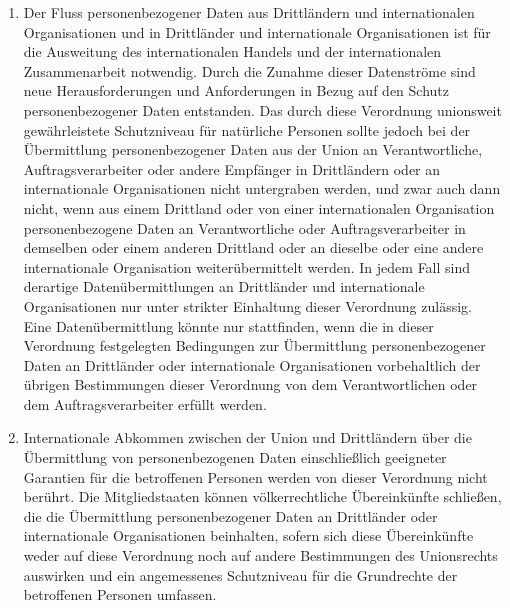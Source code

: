 \begin{enumerate}
   \item Der Fluss personenbezogener Daten aus Drittländern und internationalen Organisationen und in Drittländer und
    internationale Organisationen ist für die Ausweitung des internationalen Handels und der internationalen
    Zusammenarbeit notwendig. Durch die Zunahme dieser Datenströme sind neue Herausforderungen und Anforderungen in
    Bezug auf den Schutz personenbezogener Daten entstanden. Das durch diese Verordnung unionsweit gewährleistete
    Schutzniveau für natürliche Personen sollte jedoch bei der Übermittlung personenbezogener Daten aus der Union an
    Verantwortliche, Auftragsverarbeiter oder andere Empfänger in Drittländern oder an internationale Organisationen
    nicht untergraben werden, und zwar auch dann nicht, wenn aus einem Drittland oder von einer internationalen
    Organisation personenbezogene Daten an Verantwortliche oder Auftragsverarbeiter in demselben oder einem anderen
    Drittland oder an dieselbe oder eine andere internationale Organisation weiterübermittelt werden. In jedem Fall
    sind derartige Datenübermittlungen an Drittländer und internationale Organisationen nur unter strikter Einhaltung
    dieser Verordnung zulässig. Eine Datenübermittlung könnte nur stattfinden, wenn die in dieser Verordnung
    festgelegten Bedingungen zur Übermittlung personenbezogener Daten an Drittländer oder internationale Organisationen
    vorbehaltlich der übrigen Bestimmungen dieser Verordnung von dem Verantwortlichen oder dem Auftragsverarbeiter
    erfüllt werden.%
   \label{itm:eg-101}
   

   \item Internationale Abkommen zwischen der Union und Drittländern über die Übermittlung von personenbezogenen Daten
    einschließlich geeigneter Garantien für die betroffenen Personen werden von dieser Verordnung nicht berührt. Die
    Mitgliedstaaten können völkerrechtliche Übereinkünfte schließen, die die Übermittlung personenbezogener Daten an
    Drittländer oder internationale Organisationen beinhalten, sofern sich diese Übereinkünfte weder auf diese
    Verordnung noch auf andere Bestimmungen des Unionsrechts auswirken und ein angemessenes Schutzniveau für die
    Grundrechte der betroffenen Personen umfassen.%
   \label{itm:eg-102}
   


\end{enumerate}
